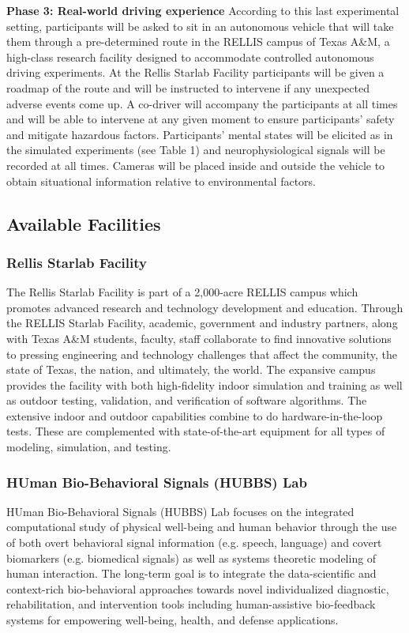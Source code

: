 \textbf{Phase 3: Real-world driving experience}
According to this last experimental setting, participants will be asked to sit in an autonomous vehicle that will take them through a pre-determined route in the RELLIS campus of Texas A\&M, a high-class research facility designed to accommodate controlled autonomous driving experiments. At the Rellis Starlab Facility participants will be given a roadmap of the route and will be instructed to intervene if any unexpected adverse events come up. A co-driver will accompany the participants at all times and will be able to intervene at any given moment to ensure participants' safety and mitigate hazardous factors. Participants' mental states will be elicited as in the simulated experiments (see Table 1) and neurophysiological signals will be recorded at all times. Cameras will be placed inside and outside the vehicle to obtain situational information relative to environmental factors.
\subsection{Available Facilities}
\subsubsection{Rellis Starlab Facility}
The Rellis Starlab Facility is part of a 2,000-acre RELLIS campus which promotes advanced research and technology development and education. Through the RELLIS Starlab Facility, academic, government and industry partners, along with Texas A\&M students, faculty, staff collaborate to find innovative solutions to pressing engineering and technology challenges that affect the community, the state of Texas, the nation, and ultimately, the world. The expansive campus provides the facility with both high-fidelity indoor simulation and training as well as outdoor testing, validation, and verification of software algorithms. The extensive indoor and outdoor capabilities combine to do hardware-in-the-loop tests. These are complemented with state-of-the-art equipment for all types of modeling, simulation, and testing.
\subsubsection{HUman Bio-Behavioral Signals (HUBBS) Lab}
HUman Bio-Behavioral Signals (HUBBS) Lab focuses on the integrated computational study of physical well-being and human behavior through the use of both overt behavioral signal information (e.g. speech, language) and covert biomarkers (e.g. biomedical signals) as well as systems theoretic modeling of human interaction. The long-term goal is to integrate the data-scientific and context-rich bio-behavioral approaches towards novel individualized diagnostic, rehabilitation, and intervention tools including human-assistive bio-feedback systems for empowering well-being, health, and defense applications.
